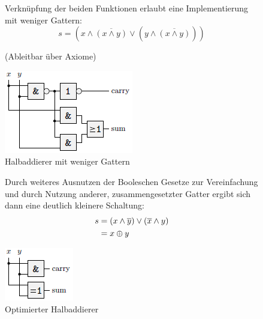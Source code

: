 \documentclass[12pt]{report}
\begin{document}
\begin{figure}[H]
  \begin{minipage}[T]{.45\textwidth}
    Verknüpfung der beiden Funktionen erlaubt eine Implementierung mit weniger Gattern:
    $$s = (x \wedge \overline{(x \wedge y)} \vee (y \wedge \overline{(x \wedge y)}))$$
    \begin{center}
      \small (Ableitbar über Axiome)
    \end{center}
  \end{minipage}
  \hfill
  \begin{minipage}[T]{.45\textwidth}
    \caption{Halbaddierer mit weniger Gattern}
    \centering
    \includegraphics{graphics/halbaddierer_02}
  \end{minipage}
\end{figure}

\begin{figure}[H]
  \begin{minipage}[T]{.45\textwidth}
    Durch weiteres Ausnutzen der Booleschen Gesetze zur Vereinfachung und
    durch Nutzung anderer, zusammengesetzter Gatter ergibt sich dann eine deutlich kleinere Schaltung:
    \begin{align*}
      \centering
      s 
       & = (x \wedge \overline{y}) \vee (\overline{x} \wedge y) \\
       & = x \oplus y                                           \\
    \end{align*}
  \end{minipage}
  \hfill
  \begin{minipage}[T]{.45\textwidth}
    \caption{Optimierter Halbaddierer}
    \centering
    \includegraphics[scale=1.3]{graphics/halbaddierer_optimiert}
  \end{minipage}
\end{figure}
\end{document}
